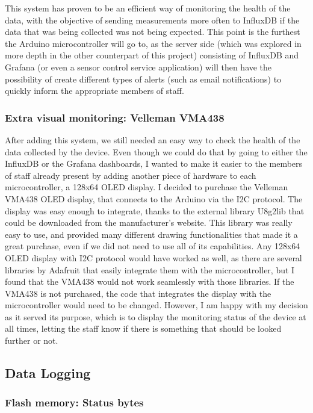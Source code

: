 \documentclass[12pt]{article}
\begin{document}
This system has proven to be an efficient way of monitoring the health of the data, with the objective of sending measurements more often to InfluxDB if the data that was being collected was not being expected. This point is the furthest the Arduino microcontroller will go to, as the server side (which was explored in more depth in the other counterpart of this project) consisting of InfluxDB and Grafana (or even a sensor control service application) will then have the possibility of create different types of alerts (such as email notifications) to quickly inform the appropriate members of staff.

\subsubsection{Extra visual monitoring: Velleman VMA438}

After adding this system, we still needed an easy way to check the health of the data collected by the device. Even though we could do that by going to either the InfluxDB or the Grafana dashboards, I wanted to make it easier to the members of staff already present by adding another piece of hardware to each microcontroller, a 128x64 OLED display. I decided to purchase the Velleman VMA438 OLED display, that connects to the Arduino via the I2C protocol. The display was easy enough to integrate, thanks to the external library U8g2lib that could be downloaded from the manufacturer's website. This library was really easy to use, and provided many different drawing functionalities that made it a great purchase, even if we did not need to use all of its capabilities. Any 128x64 OLED display with I2C protocol would have worked as well, as there are several libraries by Adafruit that easily integrate them with the microcontroller, but I found that the VMA438 would not work seamlessly with those libraries. If the VMA438 is not purchased, the code that integrates the display with the microcontroller would need to be changed. However, I am happy with my decision as it served its purpose, which is to display the monitoring status of the device at all times, letting the staff know if there is something that should be looked further or not.

\subsection{Data Logging}

\subsubsection{Flash memory: Status bytes}
\end{document}
